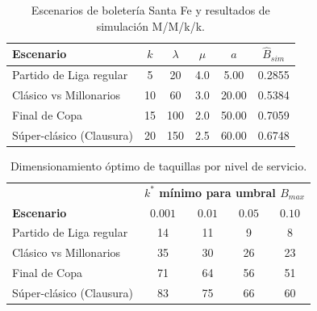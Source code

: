 
\begin{table}[H]
\centering
\caption{Escenarios de boletería Santa Fe y resultados de simulación M/M/k/k.}
\label{tab:santa_fe_resultados}
\begin{tabular}{lccccc}
\toprule
\textbf{Escenario} & $k$ & $\lambda$ & $\mu$ & $a$ & $\hat{B}_{sim}$ \\
\midrule
Partido de Liga regular & 5 & 20 & 4.0 & 5.00 & 0.2855 \\
Clásico vs Millonarios & 10 & 60 & 3.0 & 20.00 & 0.5384 \\
Final de Copa & 15 & 100 & 2.0 & 50.00 & 0.7059 \\
Súper-clásico (Clausura) & 20 & 150 & 2.5 & 60.00 & 0.6748 \\
\bottomrule
\end{tabular}
\end{table}

\begin{table}[H]
\centering
\caption{Dimensionamiento óptimo de taquillas por nivel de servicio.}
\label{tab:santa_fe_dimensionamiento}
\begin{tabular}{l|cccc}
\toprule
& \multicolumn{4}{c}{\textbf{$k^*$ mínimo para umbral $B_{max}$}} \\
\textbf{Escenario} & $0.001$ & $0.01$ & $0.05$ & $0.10$ \\
\midrule
Partido de Liga regular & 14 & 11 & 9 & 8 \\
Clásico vs Millonarios & 35 & 30 & 26 & 23 \\
Final de Copa & 71 & 64 & 56 & 51 \\
Súper-clásico (Clausura) & 83 & 75 & 66 & 60 \\
\bottomrule
\end{tabular}
\end{table}